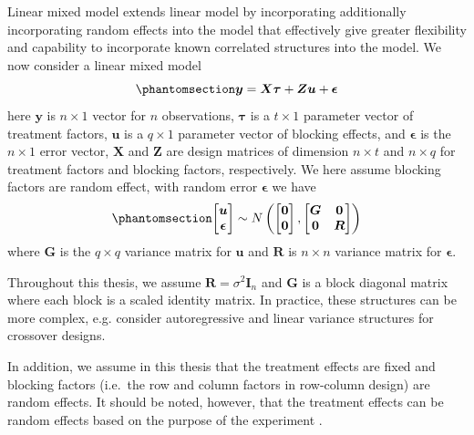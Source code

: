 \documentclass[
  a4paper,
  oneside,
  openany,
  12pt,
  onecolumn]{book}
\theoremstyle{definition}
\theoremstyle{definition}
\theoremstyle{plain}
\theoremstyle{remark}
\begin{document}
Linear mixed model extends linear model by incorporating additionally
incorporating random effects into the model that effectively give
greater flexibility and capability to incorporate known correlated
structures into the model. We now consider a linear mixed model
\begin{equation}\phantomsection\label{eq-lmm}{
\boldsymbol{y}=\boldsymbol{X}\boldsymbol{\tau}+\boldsymbol{Z}\boldsymbol{u}+\boldsymbol{\epsilon}
}\end{equation} here \(\boldsymbol{y}\) is \(n\times 1\) vector for
\(n\) observations, \(\boldsymbol{\tau}\) is a \(t\times1\) parameter
vector of treatment factors, \(\boldsymbol{u}\) is a \(q \times1\)
parameter vector of blocking effects, and \(\boldsymbol{\epsilon}\) is
the \(n\times 1\) error vector, \(\boldsymbol{X}\) and
\(\boldsymbol{Z}\) are design matrices of dimension \(n \times t\) and
\(n \times q\) for treatment factors and blocking factors, respectively.
We here assume blocking factors are random effect, with random error
\(\boldsymbol{\epsilon}\) we have
\begin{equation}\phantomsection\label{eq-dist}{
\begin{bmatrix}
\boldsymbol{u} \\
\boldsymbol{\epsilon} 
\end{bmatrix}
\sim
N\left(
\begin{bmatrix}
\boldsymbol{0} \\
\boldsymbol{0}
\end{bmatrix}
,
\begin{bmatrix}
\boldsymbol{G} & \boldsymbol{0} \\
\boldsymbol{0} & \boldsymbol{R}
\end{bmatrix}
\right)
}\end{equation} where \(\boldsymbol{G}\) is the \(q \times q\) variance
matrix for \(\boldsymbol{u}\) and \(\boldsymbol{R}\) is \(n\times n\)
variance matrix for \(\boldsymbol{\epsilon}\).

Throughout this thesis, we assume
\(\boldsymbol{R} = \sigma^2\mathbf{I}_n\) and \(\boldsymbol{G}\) is a
block diagonal matrix where each block is a scaled identity matrix. In
practice, these structures can be more complex, e.g.
\citet{williamsConstructionCrossoverDesigns2007} consider autoregressive
and linear variance structures for crossover designs.

In addition, we assume in this thesis that the treatment effects are
fixed and blocking factors (i.e.~the row and column factors in
row-column design) are random effects. It should be noted, however, that
the treatment effects can be random effects based on the purpose of the
experiment
\citep{robinsonThatBLUPGood1991, butlerDesignFieldExperiments2014}.
\end{document}
